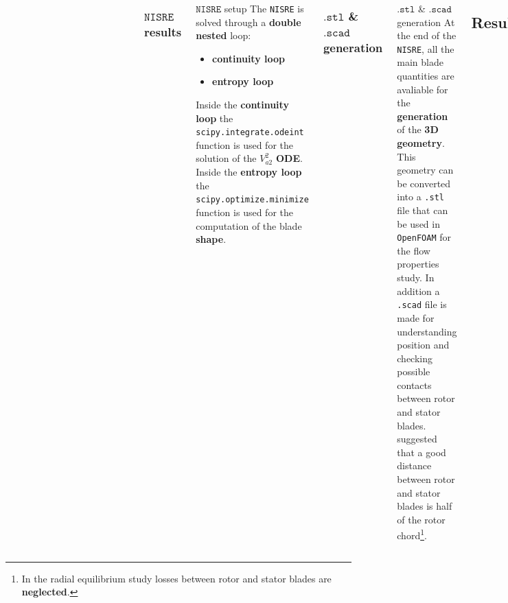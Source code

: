 	\begin{columns}
			\begin{figure}
			\end{figure}
			\begin{figure}
			\end{figure}
\subsubsection{$\mathtt{NISRE}$ results}
	\begin{frame}[fragile]{$\mathtt{NISRE}$ setup}
		The \verb|NISRE| is solved through a \textbf{double nested} loop:
		\begin{itemize}
			\item \textbf{continuity loop}
			\item \textbf{entropy loop}
		\end{itemize}
		Inside the \textbf{continuity loop} the \verb|scipy.integrate.odeint| function is used for the solution of the $V_{a2}^2$ \textbf{ODE}.
		\newline
		\newline
		Inside the \textbf{entropy loop} the \verb|scipy.optimize.minimize| function is used for the computation of the blade \textbf{shape}.
	\end{frame}
\subsubsection{$\mathtt{.stl}$ \& $\mathtt{.scad}$ generation}
	\begin{frame}[fragile]{$\mathtt{.stl}$ \& $\mathtt{.scad}$ generation}
		At the end of the \verb|NISRE|, all the main blade quantities are avaliable for the \textbf{generation} of the \textbf{3D geometry}. This geometry can be converted into a \verb|.stl| file that can be used in \verb|OpenFOAM| for the flow properties study. In addition a \verb|.scad| file is made for understanding position and checking possible contacts between rotor and stator blades.	
		\newline
		\newline 
		\cite{baskharone2006principles} suggested that a good distance between rotor and stator blades is half of the rotor chord\footnote{In the radial equilibrium study losses between rotor \newline and stator blades are \textbf{neglected}.}.
	\end{frame}
\subsection{Results}

\end{columns}
